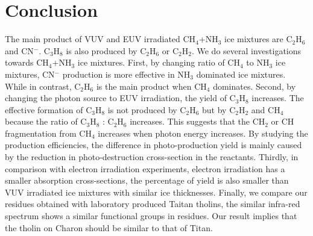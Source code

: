 \section{Conclusion} %

The main product of VUV and EUV irradiated CH$_4$+NH$_3$ ice mixtures are C$_2$H$_6$ and CN$^-$. C$_3$H$_8$ is also produced by C$_2$H$_6$ or C$_2$H$_2$. We do several investigations towards CH$_4$+NH$_3$ ice mixtures. First, by changing ratio of CH$_4$ to NH$_3$ ice mixtures, CN$^-$ production is more effective in NH$_3$ dominated ice mixtures. While in contrast, C$_2$H$_6$ is the main product when CH$_4$ dominates. Second, by changing the photon source to EUV irradiation, the yield of C$_3$H$_8$ increases. The effective formation of C$_3$H$_8$ is not produced by C$_2$H$_6$ but by C$_2$H$_2$ and CH$_4$ because the ratio of C$_3$H$_8$ : C$_2$H$_6$ increases. This suggests that the CH$_2$ or CH fragmentation from CH$_4$ increases when photon energy increases. By studying the production efficiencies, the difference in photo-production yield is mainly caused by the reduction in photo-destruction cross-section in the reactants. Thirdly, in comparison with electron irradiation experiments, electron irradiation has a smaller absorption cross-sections, the percentage of yield is also smaller than VUV irradiated ice mixtures with similar ice thicknesses. Finally, we compare our residues obtained with laboratory produced Taitan tholins, the similar infra-red spectrum shows a similar functional groups in residues. Our result implies that the tholin on Charon should be similar to that of Titan.



